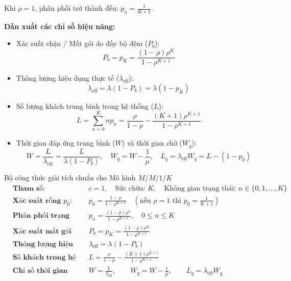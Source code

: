 Khi $\rho = 1$, phân phối trở thành đều: $p_n = \frac{1}{K+1}$.

\textbf{Dẫn xuất các chỉ số hiệu năng:}
\begin{itemize}[leftmargin=1.5em]
    \item Xác suất chặn / Mất gói do đầy bộ đệm ($P_b$):
    \begin{equation}
        P_b = p_K = \frac{(1 - \rho)\rho^K}{1 - \rho^{K+1}}
    \end{equation}
    \item Thông lượng hiệu dụng thực tế ($\lambda_{\text{eff}}$):
    \begin{equation}
        \lambda_{\text{eff}} = \lambda (1 - P_b) = \lambda (1 - p_K)
    \end{equation}
    \item Số lượng khách trung bình trong hệ thống ($L$):
    \begin{equation}
        L = \sum_{n=0}^K n p_n = \frac{\rho}{1 - \rho} - \frac{(K+1)\rho^{K+1}}{1 - \rho^{K+1}}
    \end{equation}
    \item Thời gian đáp ứng trung bình ($W$) và thời gian chờ ($W_q$):
    \begin{equation}
        W = \frac{L}{\lambda_{\text{eff}}} = \frac{L}{\lambda(1 - P_b)}, \quad W_q = W - \frac{1}{\mu}, \quad L_q = \lambda_{\text{eff}} W_q = L - (1 - p_0)
    \end{equation}
\end{itemize}

\begin{modelbox}{Bộ công thức giải tích chuẩn cho Mô hình $M/M/1/K$}
\begin{align*}
    &\textbf{Tham số:} && c = 1, \quad \text{Sức chứa: } K, \quad \text{Không gian trạng thái: } n \in \{0, 1, \dots, K\} \\[4pt]
    &\textbf{Xác suất rỗng } p_0\textbf{:} && p_0 = \frac{1 - \rho}{1 - \rho^{K+1}} \quad (\text{nếu } \rho = 1 \text{ thì } p_0 = \frac{1}{K+1}) \\[4pt]
    &\textbf{Phân phối trạng thái dừng:} && p_n = \frac{(1 - \rho)\rho^n}{1 - \rho^{K+1}}, \quad 0 \le n \le K \\[4pt]
    &\textbf{Xác suất mất gói (Chặn):} && P_b = p_K = \frac{(1 - \rho)\rho^K}{1 - \rho^{K+1}} \\[4pt]
    &\textbf{Thông lượng hiệu dụng:} && \lambda_{\text{eff}} = \lambda(1 - P_b) \\[4pt]
    &\textbf{Số khách trong hệ thống:} && L = \frac{\rho}{1 - \rho} - \frac{(K+1)\rho^{K+1}}{1 - \rho^{K+1}} \\[4pt]
    &\textbf{Chỉ số thời gian (Little):} && W = \frac{L}{\lambda_{\text{eff}}}, \qquad W_q = W - \frac{1}{\mu}, \qquad L_q = \lambda_{\text{eff}} W_q
\end{align*}
\end{modelbox}

